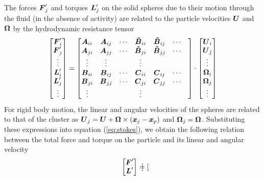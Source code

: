 \begin{appendices}
The forces $\boldsymbol{F}'_j$ and torques $\boldsymbol{L}'_j$ on the solid spheres due to their motion through the fluid (in the absence of activity) are related to the particle velocities $\boldsymbol{U}$ and $\boldsymbol{\Omega}$ by the hydrodynamic resistance tensor
\begin{equation}
    \begin{bmatrix} \boldsymbol{F}'_i \\ \boldsymbol{F}'_j \\ \vdots \\ \boldsymbol{L}'_i \\ \boldsymbol{L}'_j \\ \vdots \end{bmatrix} = 
    \begin{bmatrix} 
        \boldsymbol{A}_{ii} & \boldsymbol{A}_{ij} & \cdots & \boldsymbol{\tilde{B}}_{ii} & \boldsymbol{\tilde{B}}_{ij} & \cdots \\ 
        \boldsymbol{A}_{ji} & \boldsymbol{A}_{jj} & \cdots & \boldsymbol{\tilde{B}}_{ji} & \boldsymbol{\tilde{B}}_{jj} & \cdots \\  
        \vdots  & \vdots & & \vdots & &  & \\ 
        \boldsymbol{B}_{ii} & \boldsymbol{B}_{ij} & \cdots & \boldsymbol{C}_{ii} & \boldsymbol{C}_{ij} & \cdots \\ 
        \boldsymbol{B}_{ji} & \boldsymbol{B}_{jj} & \cdots & \boldsymbol{C}_{ji} & \boldsymbol{C}_{jj} & \cdots \\  
        \vdots  & & & \vdots & &  &  
    \end{bmatrix} 
    \cdot
    \begin{bmatrix} \boldsymbol{U}_i \\ \boldsymbol{U}_j \\ \vdots \\ \boldsymbol{\Omega}_i \\ \boldsymbol{\Omega}_j \\ \vdots \end{bmatrix}\label{eq:stokes}
\end{equation}
For rigid body motion, the linear and angular velocities of the spheres are related to that of the cluster as $\boldsymbol{U}_j=\boldsymbol{U}+\boldsymbol{\Omega}\times(\boldsymbol{x}_j - \boldsymbol{x}_p)$ and $\boldsymbol{\Omega}_j=\boldsymbol{\Omega}$.  Substituting these expressions into equation (\ref{eq:stokes}), we obtain the following relation between the total force and torque on the particle and its linear and angular velocity
\begin{equation}
    \begin{bmatrix} \boldsymbol{F}' \\ \boldsymbol{L}' \end{bmatrix} = 
    \begin{bmatrix} 

\end{bmatrix}
\end{equation}
\end{appendices}

